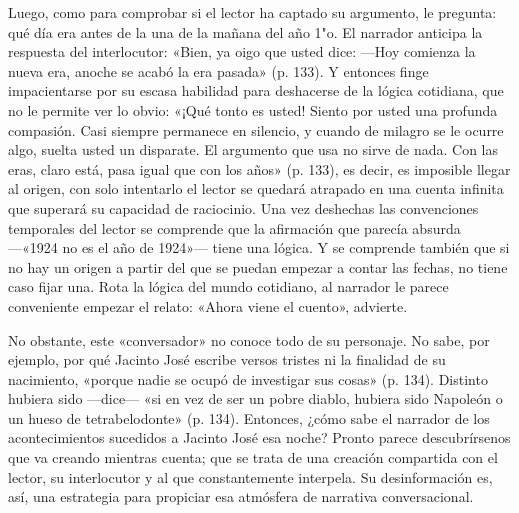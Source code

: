 \documentclass[14pt,twoside,final]{extbook} %
\begin{document}
Luego, como para comprobar si el lector ha captado su argumento, le pregunta: qué día era antes de la una de la mañana del año 1"o. El narrador anticipa la respuesta del interlocutor: «Bien, ya oigo que usted dice: ---Hoy comienza la nueva era, anoche se acabó la era pasada» (p. 133). Y entonces finge impacientarse por su escasa habilidad para deshacerse de la lógica cotidiana, que no le permite ver lo obvio: «¡Qué tonto es usted! Siento por usted una profunda compasión. Casi siempre permanece en silencio, y cuando de milagro se le ocurre algo, suelta usted un disparate. El argumento que usa no sirve de nada. Con las eras, claro está, pasa igual que con los años» (p. 133), es decir, es imposible llegar al origen, con solo intentarlo el lector se quedará atrapado en una cuenta infinita que superará su capacidad de raciocinio. Una vez deshechas las convenciones temporales del lector se comprende que la afirmación que parecía absurda ---«1924 no es el año de 1924»--- tiene una lógica. Y se comprende también que si no hay un origen a partir del que se puedan empezar a contar las fechas, no tiene caso fijar una. Rota la lógica del mundo cotidiano, al narrador le parece conveniente empezar el relato: «Ahora viene el cuento», advierte.

No obstante, este «conversador» no conoce todo de su personaje. No sabe, por ejemplo, por qué Jacinto José escribe versos tristes ni la finalidad de su nacimiento, «porque nadie se ocupó de investigar sus cosas» (p. 134). Distinto hubiera sido ---dice--- «si en vez de ser un pobre diablo, hubiera sido Napoleón o un hueso de tetrabelodonte» (p. 134). Entonces, ¿cómo sabe el narrador de los acontecimientos sucedidos a Jacinto José esa noche? Pronto parece descubrírsenos que va creando mientras cuenta; que se trata de una creación compartida con el lector, su interlocutor y al que constantemente interpela. Su desinformación es, así, una estrategia para propiciar esa atmósfera de narrativa conversacional.
\end{document}
